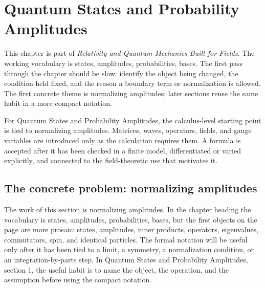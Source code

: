 \chapter{Quantum States and Probability Amplitudes}


This chapter is part of \emph{Relativity and Quantum Mechanics Built for Fields}.  The working vocabulary is states, amplitudes, probabilities, bases.  The first pass through the chapter should be slow: identify the object being changed, the condition held fixed, and the reason a boundary term or normalization is allowed.  The first concrete theme is normalizing amplitudes; later sections reuse the same habit in a more compact notation.

For Quantum States and Probability Amplitudes, the calculus-level starting point is tied to normalizing amplitudes.  Matrices, waves, operators, fields, and gauge variables are introduced only as the calculation requires them.  A formula is accepted after it has been checked in a finite model, differentiated or varied explicitly, and connected to the field-theoretic use that motivates it.

\section{The concrete problem: normalizing amplitudes}













The work of this section is normalizing amplitudes.  In the chapter heading the vocabulary is states, amplitudes, probabilities, bases, but the first objects on the page are more prosaic: states, amplitudes, inner products, operators, eigenvalues, commutators, spin, and identical particles.  The formal notation will be useful only after it has been tied to a limit, a symmetry, a normalization condition, or an integration-by-parts step.  In Quantum States and Probability Amplitudes, section 1, the useful habit is to name the object, the operation, and the assumption before using the compact notation.

